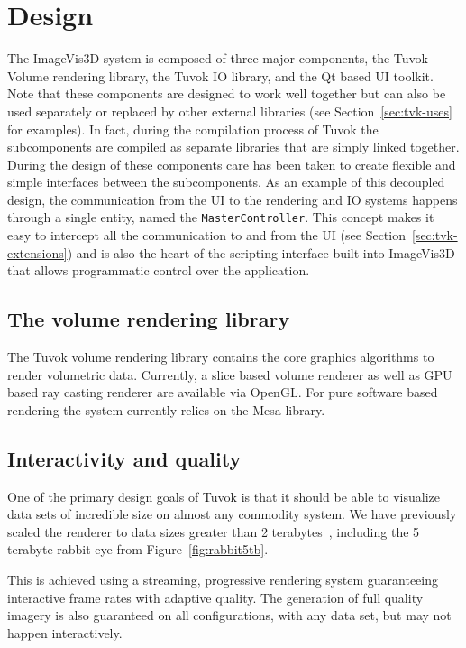 \section{Design}
\label{sec:tvk-design}

The ImageVis3D system is composed of three major
components, the Tuvok Volume rendering library, the Tuvok IO
library, and the Qt based UI toolkit. Note that these
components are designed to work well together but can also be
used separately or replaced by other external libraries (see
Section~\ref{sec:tvk-uses} for examples). In fact, during the
compilation process of Tuvok the subcomponents are compiled as separate
libraries that are simply linked together. During the design of these
components care has been taken to create flexible and simple interfaces
between the subcomponents. As an example of this decoupled design,
the communication from the UI to the rendering and IO systems happens
through a single entity, named the \texttt{MasterController}. This concept makes
it easy to intercept all the communication to and from the
UI (see Section~\ref{sec:tvk-extensions}) and is also the heart of the
scripting interface built into ImageVis3D that allows programmatic
control over the application.

\subsection{The volume rendering library}

The Tuvok volume rendering library contains the core graphics
algorithms to render volumetric data. Currently, a slice based volume
renderer as well as GPU based ray casting renderer are available via
OpenGL. For pure software based rendering the system currently relies
on the Mesa library.

\subsection{Interactivity and quality}

One of the primary design goals of Tuvok is that it should be able
to visualize data sets of incredible size on almost any commodity
system. We have previously scaled the renderer to
data sizes greater than 2 terabytes~\cite{Fogal:2010:HPG}, including
the 5
terabyte rabbit eye from Figure~\ref{fig:rabbit5tb}.

This is achieved using a streaming, progressive rendering
system guaranteeing interactive frame rates with adaptive
quality. The generation of full quality imagery is also
guaranteed on all configurations, with any data set, but may not
happen interactively.

